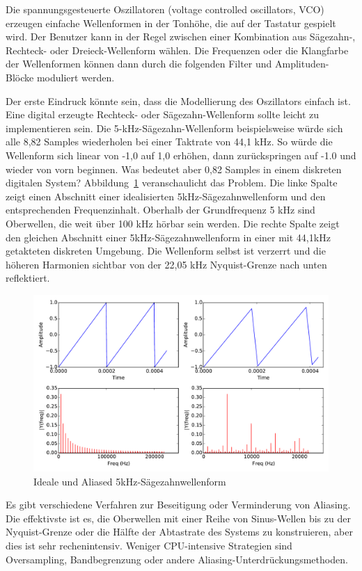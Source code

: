 Die spannungsgesteuerte Oszillatoren (voltage controlled oscillators, VCO) erzeugen einfache Wellenformen in der Tonhöhe, die auf der Tastatur gespielt wird. Der Benutzer kann in der Regel zwischen einer Kombination aus Sägezahn-, Rechteck- oder Dreieck-Wellenform wählen. Die Frequenzen oder die Klangfarbe der Wellenformen können dann durch die folgenden Filter und Amplituden-Blöcke moduliert werden.

Der erste Eindruck könnte sein, dass die Modellierung des Oszillators einfach ist. Eine digital erzeugte Rechteck- oder Sägezahn-Wellenform sollte leicht zu implementieren sein. Die 5-kHz-Sägezahn-Wellenform beispielsweise würde sich alle 8,82 Samples wiederholen bei einer Taktrate von 44,1 kHz. So würde die Wellenform sich linear von -1,0 auf 1,0 erhöhen, dann zurückspringen auf -1.0 und wieder von vorn beginnen.  Was bedeutet aber 0,82 Samples in einem diskreten digitalen System? Abbildung~\ref{fig:aliasing_sawtooth} veranschaulicht das Problem. Die linke Spalte zeigt einen Abschnitt einer idealisierten 5kHz-Sägezahnwellenform und den entsprechenden Frequenzinhalt. Oberhalb der Grundfrequenz 5 kHz sind Oberwellen, die weit über 100 kHz hörbar sein werden. Die rechte Spalte zeigt den gleichen Abschnitt einer 5kHz-Sägezahnwellenform in einer mit 44,1kHz getakteten diskreten Umgebung. Die Wellenform selbst ist verzerrt und die höheren Harmonien sichtbar von der 22,05 kHz Nyquist-Grenze nach unten reflektiert.

\begin{figure}[H]
    \centering
    \includegraphics[width=\textwidth]{plots/graphics/sawtooth.pdf}
    \caption{Ideale und Aliased 5kHz-Sägezahnwellenform}
    \label{fig:aliasing_sawtooth}
\end{figure}

Es gibt verschiedene Verfahren zur Beseitigung oder Verminderung von Aliasing. Die effektivste ist es, die Oberwellen mit einer Reihe von Sinus-Wellen bis zu der Nyquist-Grenze oder die Hälfte der Abtastrate des Systems zu konstruieren, aber dies ist sehr rechenintensiv. Weniger CPU-intensive Strategien sind Oversampling, Bandbegrenzung oder andere Aliasing-Unterdrückungsmethoden\cite{virtual_analog_synthesis}.





